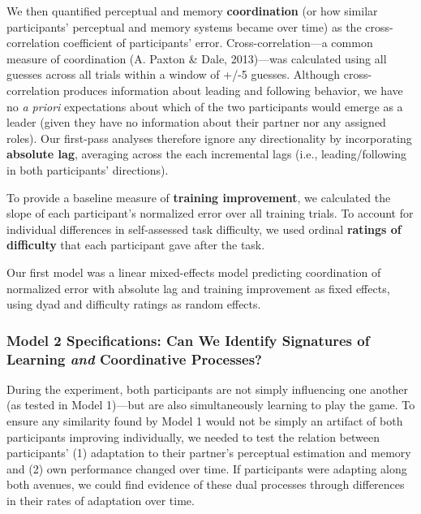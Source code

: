 \documentclass[10pt, letterpaper]{article}
\begin{document}
We then quantified perceptual and memory \textbf{coordination} (or how
similar participants' perceptual and memory systems became over time) as
the cross-correlation coefficient of participants' error.
Cross-correlation---a common measure of coordination (A. Paxton \& Dale,
2013)---was calculated using all guesses across all trials within a
window of +/-5 guesses. Although cross-correlation produces information
about leading and following behavior, we have no \emph{a priori}
expectations about which of the two participants would emerge as a
leader (given they have no information about their partner nor any
assigned roles). Our first-pass analyses therefore ignore any
directionality by incorporating \textbf{absolute lag}, averaging across
the each incremental lags (i.e., leading/following in both participants'
directions).

To provide a baseline measure of \textbf{training improvement}, we
calculated the slope of each participant's normalized error over all
training trials. To account for individual differences in self-assessed
task difficulty, we used ordinal \textbf{ratings of difficulty} that
each participant gave after the task.

Our first model was a linear mixed-effects model predicting coordination
of normalized error with absolute lag and training improvement as fixed
effects, using dyad and difficulty ratings as random effects.

\subsubsection{\texorpdfstring{Model 2 Specifications: Can We Identify
Signatures of Learning \emph{and} Coordinative
Processes?}{Model 2 Specifications: Can We Identify Signatures of Learning and Coordinative Processes?}}\label{model-2-specifications-can-we-identify-signatures-of-learning-and-coordinative-processes}

During the experiment, both participants are not simply influencing one
another (as tested in Model 1)---but are also simultaneously learning to
play the game. To ensure any similarity found by Model 1 would not be
simply an artifact of both participants improving individually, we
needed to test the relation between participants' (1) adaptation to
their partner's perceptual estimation and memory and (2) own performance
changed over time. If participants were adapting along both avenues, we
could find evidence of these dual processes through differences in their
rates of adaptation over time.
\end{document}
